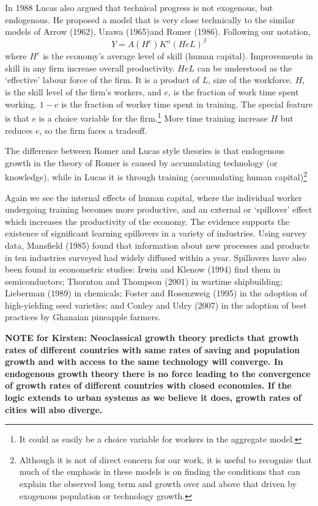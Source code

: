 In 1988 Lucas also argued that technical progress is not exogenous, but endogenous. He proposed a model that is very close technically to the similar models of Arrow (1962), Uzawa (1965)and Romer (1986). Following our notation, 
\[ Y = A(H^e) K^\alpha (HeL)^\beta \] 
where $H^e$ is the economy's average level of skill (human capital).  Improvements in skill in any firm  increase overall productivity.  $HeL$  can be understood as the `effective' labour force of the firm. It is a product of $L$, size of the workforce. $H$, is the skill level of the firm's workers, and $e$, is the fraction of work time spent working. $1-e$ is the fraction of worker time  spent in training. The  special feature is that $e$ is a choice variable for the firm.\footnote{It could as easily be a choice variable for workers in the aggregate model.} More time training increase $H$ but reduces $e$, so the firm faces a tradeoff.


The difference between Romer and Lucas style theories is that endogenous growth in the theory of Romer is caused by accumulating technology (or knowledge), while in Lucas it is through training (accumulating human capital)\footnote{Although it is not of direct concern for our work, it is useful to recognize that much of the emphasis in these models is on finding the conditions that can explain the observed long term  and growth over and above that driven by exogenous population or technology growth. }


Again we see the  internal effects of human capital, where the individual worker undergoing training becomes more productive, and an external or `spillover' effect which increases the productivity of the economy. 
The evidence supports the existence of significant learning spillovers in a variety of industries. Using survey data, Mansfield (1985) found that information about new processes and products in ten industries surveyed had widely diffused within a year. Spillovers have also been found in econometric studies: Irwin and Klenow (1994) find them in semiconductors; Thornton and Thompson (2001) in wartime shipbuilding; Lieberman (1989) in chemicals; Foster and Rosenzweig (1995) in the adoption of high-yielding seed varieties; and Conley and Udry (2007) in the adoption of best practices by Ghanaian pineapple farmers. 

\textbf{ NOTE for Kirsten:  Neoclassical  growth theory predicts that growth rates of different countries with same rates of saving and population growth and with access to the same technology will converge. In  endogenous growth theory there is no force leading to the convergence of growth rates of different countries with closed economies. If the logic extends to urban systems as we believe it does, growth rates of cities will also diverge.}


